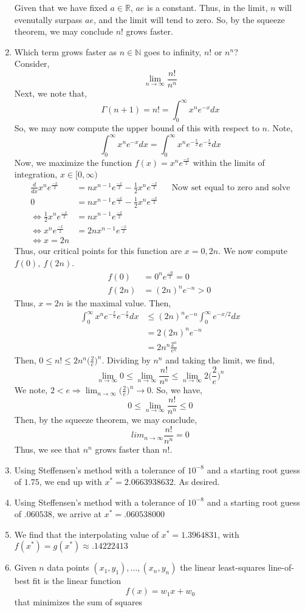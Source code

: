 \documentclass[letterpaper,10pt]{article}
\newcommand{\R}{\mathbb{R}}
\newcommand{\N}{\mathbb{N}}
\begin{document}
\begin{enumerate}
Given that we have fixed $a\in \R$, $ae$ is a constant. Thus, in the limit, $n$ will evenutally surpass $ae$, and the limit will tend to zero. So, by the squeeze theorem, we may conclude $n!$ grows faster.
\item Which term grows faster as $n\in \N$ goes to infinity, $n!$ or $n^n$?\\
Consider,
\[\lim_{n\to\infty}\frac{n!}{n^n}\]
Next, we note that,
\[\Gamma(n+1)=n!=\int_0^{\infty}x^ne^{-x}dx\]
So, we may now compute the upper bound of this with respect to $n$. Note,
\[\int_0^{\infty}x^ne^{-x}dx=\int_0^{\infty}x^ne^{-\frac{x}{2}}e^{-\frac{x}{2}}dx\]
Now, we maximize the function $f(x)=x^ne^{\frac{-x}{2}}$ within the limits of integration, $x\in [0,\infty)$
\begin{align*}
\frac{d}{dx}x^ne^{\frac{-x}{2}} &= nx^{n-1}e^{\frac{-x}{2}}-\frac{1}{2}x^ne^{\frac{-x}{2}} &&\text{Now set equal to zero and solve}\\
0 &= nx^{n-1}e^{\frac{-x}{2}}-\frac{1}{2}x^ne^{\frac{-x}{2}}\\
\Leftrightarrow \frac{1}{2}x^ne^{\frac{-x}{2}} &= nx^{n-1}e^{\frac{-x}{2}}\\
\Leftrightarrow x^ne^{\frac{-x}{2}} &= 2nx^{n-1}e^{\frac{-x}{2}}\\
\Leftrightarrow x=2n
\end{align*}
Thus, our critical points for this function are $x=0,2n$. We now compute $f(0),\ f(2n)$.
\begin{align*}
f(0) &= 0^ne^{\frac{-0}{2}}=0\\
f(2n) &= (2n)^ne^{-n}>0\
\end{align*}
Thus, $x=2n$ is the maximal value. Then,
\begin{align*}
\int_0^{\infty}x^ne^{-\frac{x}{2}}e^{-\frac{x}{2}}dx &\leq (2n)^ne^{-n}\int_0^{\infty}e^{-x/2}dx\\
&=2(2n)^ne^{-n}\\
&=2n^n\frac{2^n}{e^n}
\end{align*}
Then, $0\leq n! \leq 2n^n\big(\frac{2}{e}\big)^n$. Dividing by $n^n$ and taking the limit, we find,
\[\lim_{n\to\infty} 0\leq \lim_{n\to\infty}\frac{n!}{n^n} \leq \lim_{n\to\infty}2\big(\frac{2}{e}\big)^n\]
We note, $2<e \Rightarrow \lim_{n\to \infty} \big(\frac{2}{e}\big)^n\to 0$. So, we have,
\[0\leq \lim_{n\to\infty}\frac{n!}{n^n} \leq 0\]
Then, by the squeeze theorem, we may conclude,
\[lim_{n\to\infty}\frac{n!}{n^n}=0\]
Thus, we see that $n^n$ grows faster than $n!$.
\item Using Steffensen's method with a tolerance of $10^{-8}$ and a starting root guess of $1.75$, we end up with $x^*=2.0663938632$. As desired. 
\item Using Steffensen's method with a tolerance of $10^{-8}$ and a starting root guess of $.060538$, we arrive at $x^*=.060538000$
\item We find that the interpolating value of $x^*=1.3964831$, with $f(x^*)=g(x^*)\approx .14222413$
\item Given $n$ data points $(x_1,y_1),\ldots,(x_n,y_n)$ the linear least-squares line-of-best fit is the linear function \[f(x) = w_1x + w_0\] that minimizes the sum of squares


\end{enumerate}
\end{document}
